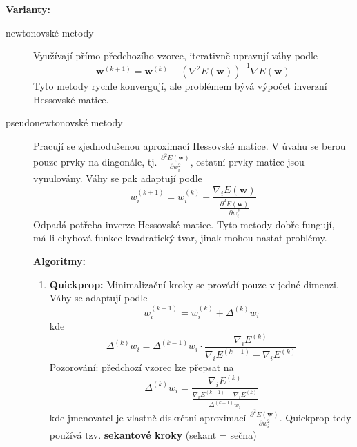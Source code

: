 \documentclass[11pt]{report} %
\renewcommand{\vec}[1]{\mathbf{#1}}
\numberwithin{equation}{section}
\begin{document}
\textbf{Varianty:}
\begin{description}
	
	
	\item[newtonovské metody] Využívají přímo předchozího vzorce, iterativně upravují váhy podle
	$$
	\vec{w}^{(k+1)} = \vec{w}^{(k)} - (\nabla^2 E(\vec{w}))^{-1} \nabla E(\vec{w})
	$$
	Tyto metody rychle konvergují, ale problémem bývá výpočet inverzní Hessovské matice.
	
	\item[pseudonewtonovské metody] Pracují se zjednodušenou aproximací Hessovské matice. V úvahu se berou pouze prvky na diagonále, tj. $\frac{\partial^2E(\vec{w})}{\partial w_i^2}$, ostatní prvky matice jsou vynulovány. Váhy se pak adaptují podle
	$$
	w_i^{(k+1)} = w_i^{(k)} - \frac{\nabla_i E(\vec{w})}{\frac{\partial^2 E(\vec{w})}{\partial w_i^2}} 
	$$
	Odpadá potřeba inverze Hessovské matice. Tyto metody dobře fungují, má-li chybová funkce kvadratický tvar, jinak mohou nastat problémy.
	
	\noindent\textbf{Algoritmy:}
	\begin{enumerate}
		
		
		\item \textbf{Quickprop:} Minimalizační kroky se provádí pouze v jedné dimenzi.
		Váhy se adaptují podle
		$$
		w_i^{(k+1)} = w_i^{(k)} + \Delta^{(k)} w_i
		$$	
		kde
		$$\Delta^{(k)} w_i = \Delta^{(k-1)} w_i \cdot \frac{\nabla_i E^{(k)}}{\nabla_i E^{(k-1)} - \nabla_i E^{(k)}}$$
		Pozorování: předchozí vzorec lze přepsat na 
		$$\Delta^{(k)} w_i = \frac{\nabla_i E^{(k)}}{\frac{\nabla_i E^{(k-1)} - \nabla_i E^{(k)}}{\Delta^{(k-1)} w_i}}$$
		kde jmenovatel je vlastně diskrétní aproximací $\frac{\partial^2 E(\vec{w})}{\partial w_i^2}$. Quickprop tedy používá tzv. \textbf{sekantové kroky} (sekant = sečna)
	\end{enumerate}
\end{description}
\end{document}
